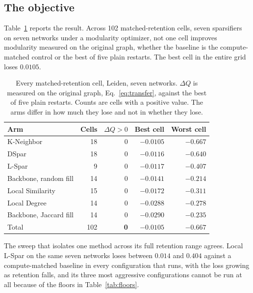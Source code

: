 \subsection{The objective}\label{sec:negative:objective}

Table~\ref{tab:negative} reports the result. Across 102 matched-retention cells,
seven sparsifiers on seven networks under a modularity optimizer, not one cell
improves modularity measured on the original graph, whether the baseline is the
compute-matched control or the best of five plain restarts. The best cell in the
entire grid loses $0.0105$.

\begin{table}[t]
\centering
\caption{Every matched-retention cell, Leiden, seven networks. $\Delta Q$ is
measured on the original graph, Eq.~\eqref{eq:transfer}, against the best of five
plain restarts. Counts are cells with a positive value. The arms differ in how
much they lose and not in whether they lose.}
\label{tab:negative}
\small
\setlength{\tabcolsep}{4pt}
\begin{tabular}{@{}lrrrr@{}}
\toprule
Arm & Cells & $\Delta Q > 0$ & Best cell & Worst cell\\
\midrule
K-Neighbor            & 18 & 0 & $-0.0105$ & $-0.667$\\
DSpar                 & 18 & 0 & $-0.0116$ & $-0.640$\\
L-Spar                &  9 & 0 & $-0.0117$ & $-0.407$\\
Backbone, random fill & 14 & 0 & $-0.0141$ & $-0.214$\\
Local Similarity      & 15 & 0 & $-0.0172$ & $-0.311$\\
Local Degree          & 14 & 0 & $-0.0288$ & $-0.278$\\
Backbone, Jaccard fill& 14 & 0 & $-0.0290$ & $-0.235$\\
\midrule
Total                 & 102 & \textbf{0} & $-0.0105$ & $-0.667$\\
\bottomrule
\end{tabular}
\end{table}

The sweep that isolates one method across its full retention range agrees. Local
L-Spar on the same seven networks loses between $0.014$ and
$0.404$ against a compute-matched baseline in every configuration that runs, with
the loss growing as retention falls, and its three most aggressive configurations
cannot be run at all because of the floors in Table~\ref{tab:floors}.

